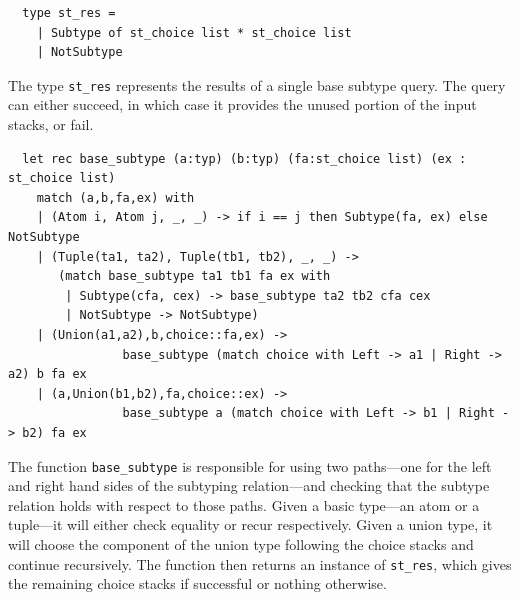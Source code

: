 \documentclass[a4paper,english]{lipics-v2019}
\begin{document}
\begin{small}
\begin{verbatim}
  type st_res =
    | Subtype of st_choice list * st_choice list
    | NotSubtype
\end{verbatim}
\end{small}

The type \verb|st_res| represents the results of a single base subtype query. The query
can either succeed, in which case it provides the unused portion of the input
stacks, or fail. 

\begin{small}
\begin{verbatim}
  let rec base_subtype (a:typ) (b:typ) (fa:st_choice list) (ex : st_choice list)
    match (a,b,fa,ex) with
    | (Atom i, Atom j, _, _) -> if i == j then Subtype(fa, ex) else NotSubtype
    | (Tuple(ta1, ta2), Tuple(tb1, tb2), _, _) ->
       (match base_subtype ta1 tb1 fa ex with
        | Subtype(cfa, cex) -> base_subtype ta2 tb2 cfa cex
        | NotSubtype -> NotSubtype)
    | (Union(a1,a2),b,choice::fa,ex) -> 
                base_subtype (match choice with Left -> a1 | Right -> a2) b fa ex
    | (a,Union(b1,b2),fa,choice::ex) -> 
                base_subtype a (match choice with Left -> b1 | Right -> b2) fa ex
\end{verbatim}
\end{small}

The function \verb|base_subtype| is responsible for using two
paths---one for the left and right hand sides of the subtyping
relation---and checking that the subtype relation holds with respect
to those paths. Given a basic type---an atom or a tuple---it will
either check equality or recur respectively. Given a union type, it
will choose the component of the union type following the choice
stacks and continue recursively. The function then returns an instance
of \verb|st_res|, which gives the remaining choice stacks if
successful or nothing otherwise.
\end{document}
